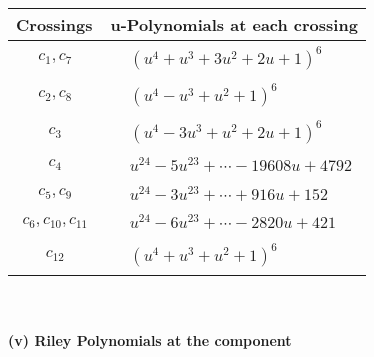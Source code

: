 \documentclass[1p]{elsarticle_modified}
\theoremstyle{definition}
\begin{document}
\begin{tabular}{m{50pt}|m{274pt}}
Crossings & \hspace{64pt}u-Polynomials at each crossing \\
\hline $$\begin{aligned}c_{1},c_{7}\end{aligned}$$&$\begin{aligned}
&(u^4+u^3+3 u^2+2 u+1)^6
\end{aligned}$\\
\hline $$\begin{aligned}c_{2},c_{8}\end{aligned}$$&$\begin{aligned}
&(u^4- u^3+u^2+1)^6
\end{aligned}$\\
\hline $$\begin{aligned}c_{3}\end{aligned}$$&$\begin{aligned}
&(u^4-3 u^3+u^2+2 u+1)^6
\end{aligned}$\\
\hline $$\begin{aligned}c_{4}\end{aligned}$$&$\begin{aligned}
&u^{24}-5 u^{23}+\cdots-19608 u+4792
\end{aligned}$\\
\hline $$\begin{aligned}c_{5},c_{9}\end{aligned}$$&$\begin{aligned}
&u^{24}-3 u^{23}+\cdots+916 u+152
\end{aligned}$\\
\hline $$\begin{aligned}c_{6},c_{10},c_{11}\end{aligned}$$&$\begin{aligned}
&u^{24}-6 u^{23}+\cdots-2820 u+421
\end{aligned}$\\
\hline $$\begin{aligned}c_{12}\end{aligned}$$&$\begin{aligned}
&(u^4+u^3+u^2+1)^6
\end{aligned}$\\
\hline
\end{tabular}\\~\\
\newpage\renewcommand{\arraystretch}{1}
\flushleft \textbf{(v) Riley Polynomials at the component}\newline \\
\end{document}
